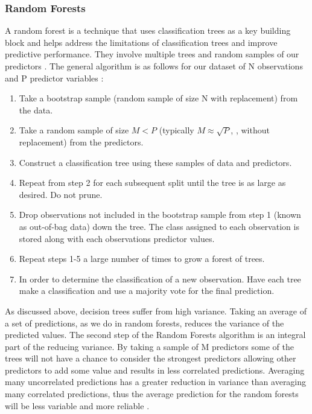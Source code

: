 \documentclass[11pt,a4paper]{article}
\begin{document}
\subsubsection{Random Forests}

A random forest is a technique that uses classification trees as a key building block and helps address the limitations of classification trees and improve predictive performance. They involve multiple trees and random samples of our predictors \citep{berk08}.
The general algorithm is as follows for our dataset of N observations and P predictor variables \citep{berk08, varian14}:
\begin{enumerate}
  \item Take a bootstrap sample (random sample of size N with replacement) from the data.
  \item Take a random sample of size $M < P$ (typically $M \approx \sqrt{P}$, \cite{james13}, without replacement) from the predictors.
  \item Construct a classification tree using these samples of data and predictors.
  \item Repeat from step 2 for each subsequent split until the tree is as large as desired. Do not prune.
  \item Drop observations not included in the bootstrap sample from step 1 (known as out-of-bag data) down the tree. The class assigned to each observation is stored along with each observations predictor values.
  \item Repeat steps 1-5 a large number of times to grow a forest of trees.
  \item In order to determine the classification of a new observation. Have each tree make a classification and use a majority vote for the final prediction.
\end{enumerate}

As discussed above, decision trees suffer from high variance. Taking an average of a set of predictions, as we do in random forests, reduces the variance of the predicted values. The second step of the Random Forests algorithm is an integral part of the reducing variance. By taking a sample of M predictors some of the trees will not have a chance to consider the strongest predictors allowing other predictors to add some value and results in less correlated predictions. Averaging many uncorrelated predictions has a greater reduction in variance than averaging many correlated predictions, thus the average prediction for the random forests will be less variable and more reliable \citep{james13}.
\end{document}
